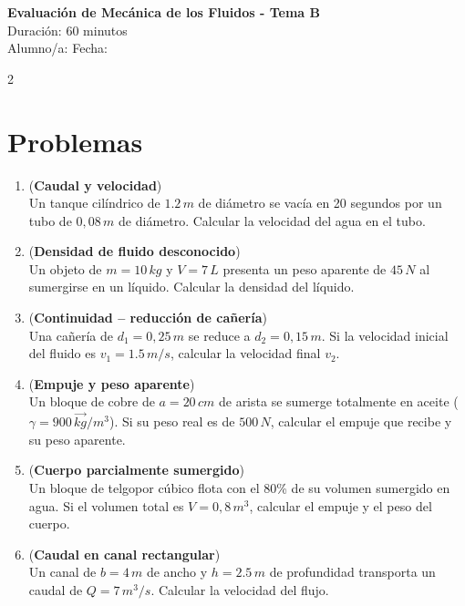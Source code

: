 \documentclass[a4paper,12pt]{article}
\begin{document}
\begin{center}
    \Large \textbf{Evaluación de Mecánica de los Fluidos - Tema B} \\
    \normalsize Duración: 60 minutos \\
    Alumno/a: \underline{\hspace{6cm}} \hspace{0.5cm} Fecha: \underline{\hspace{2cm}}
\end{center}

\vspace{0.3cm}

\begin{multicols}{2}

\section*{Problemas}

\begin{enumerate}
\item (\textbf{Caudal y velocidad})\\
Un tanque cilíndrico de $1.2\,m$ de diámetro se vacía en 20 segundos por un tubo de $0{,}08\,m$ de diámetro. Calcular la velocidad del agua en el tubo.

\item (\textbf{Densidad de fluido desconocido})\\
Un objeto de $m = 10\,kg$ y $V = 7\,L$ presenta un peso aparente de $45\,N$ al sumergirse en un líquido. Calcular la densidad del líquido.

\item (\textbf{Continuidad – reducción de cañería})\\
Una cañería de $d_1 = 0{,}25\,m$ se reduce a $d_2 = 0{,}15\,m$. Si la velocidad inicial del fluido es $v_1 = 1.5\,m/s$, calcular la velocidad final $v_2$.

\item (\textbf{Empuje y peso aparente})\\
Un bloque de cobre de $a = 20\,cm$ de arista se sumerge totalmente en aceite ($\gamma = 900\,\vec{kg}/m^3$). Si su peso real es de $500\,N$, calcular el empuje que recibe y su peso aparente.

\item (\textbf{Cuerpo parcialmente sumergido})\\
Un bloque de telgopor cúbico flota con el 80\% de su volumen sumergido en agua. Si el volumen total es $V = 0{,}8\,m^3$, calcular el empuje y el peso del cuerpo.

\item (\textbf{Caudal en canal rectangular})\\
Un canal de $b = 4\,m$ de ancho y $h = 2.5\,m$ de profundidad transporta un caudal de $Q = 7\,m^3/s$. Calcular la velocidad del flujo.

\end{enumerate}

\end{multicols}
\end{document}
